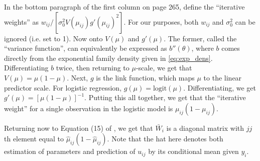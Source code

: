 \documentclass{article}
\newcommand{\logit}{\mathrm{logit}}
\begin{document}
In the bottom paragraph of the first column on page 265, \citeauthor{Boo98} define the ``iterative weights'' as $w_{ij}/ \left[ \sigma_0^2 V(\mu_{ij}) g'(\mu_{ij})^2 \right]$. For our purposes, both $w_{ij}$ and $\sigma_0^2$ can be ignored (i.e. set to 1). Now onto $V(\mu)$ and $g'(\mu)$. The former, called the ``variance function'', can equivalently be expressed as $b''(\theta)$, where $b$ comes directly from the exponential family density given in \eqref{eq:exp_dens}. Differentiating $b$ twice, then returning to $\mu$-scale, we get that $V(\mu) = \mu (1 - \mu)$. Next, $g$ is the link function, which maps $\mu$ to the linear predictor scale. For logistic regression, $g(\mu) = \logit(\mu)$. Differentiating, we get $g'(\mu) = [\mu (1 - \mu)]^{-1}$. Putting this all together, we get that the ``iterative weight'' for a single observation in the logistic model is $\mu_{ij} (1 - \mu_{ij})$.

Returning now to Equation (15) of \citeauthor{Boo98}, we get that $\bar{W}_i$ is a diagonal matrix with $jj$th element equal to $\hat{\mu}_{ij} (1 - \hat{\mu}_{ij})$. Note that the hat here denotes both estimation of parameters and prediction of $u_{ij}$ by its conditional mean given $y_i$.








\end{document}
